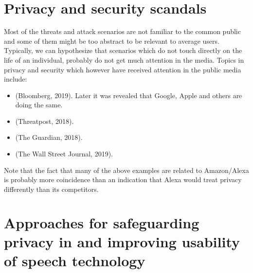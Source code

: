 \documentclass[letterpaper,10pt,english]{jupyterBook}
\begin{document}
\section{Privacy and security scandals}
\label{\detokenize{Security_and_privacy:privacy-and-security-scandals}}
\sphinxAtStartPar
Most of the threats and attack scenarios are not familiar to the common
public and some of them might be too abstract to be relevant to average
users. Typically, we can hypothesize that scenarios which do not touch
directly on the life of an individual, probably do not get much
attention in the media. Topics in privacy and security which however
have received attention in the public media include:
\begin{itemize}
\item {} 
\sphinxAtStartPar
{}
(Bloomberg, 2019). Later it was revealed that Google, Apple and
others are doing the same.

\item {} 
\sphinxAtStartPar
{}
(Threatpost, 2018).

\item {} 
\sphinxAtStartPar
{}
(The Guardian, 2018).

\item {} 
\sphinxAtStartPar
{}
(The Wall Street Journal, 2019).

\end{itemize}

\sphinxAtStartPar
Note that the fact that many of the above examples are related to
Amazon/Alexa is probably more coincidence than an indication that Alexa
would treat privacy differently than its competitors.


\section{Approaches for safeguarding privacy in and improving usability of speech technology}
\label{\detokenize{Security_and_privacy:approaches-for-safeguarding-privacy-in-and-improving-usability-of-speech-technology}}
\end{document}

